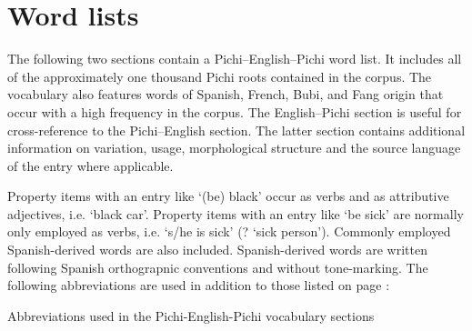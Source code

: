 \chapter{Word lists}
The following two sections contain a Pichi–English–Pichi word list. It includes all of the approximately one thousand Pichi roots contained in the corpus. The vocabulary also features words of Spanish, French, Bubi, and Fang origin that occur with a high frequency in the corpus. The English–Pichi section is useful for cross-reference to the Pichi–English section. The latter section contains additional information on variation, usage, morphological structure and the source language of the entry where applicable. 


Property items with an entry like  ‘(be) black’ occur as verbs and as attributive adjectives, i.e.  ‘black car’. Property items with an entry like  ‘be sick’ are normally only employed as verbs, i.e.  ‘s/he is sick’ (? ‘sick person’). Commonly employed Spanish-derived words are also included. Spanish-derived words are written following Spanish orthograpnic conventions and without tone-marking. The following abbreviations are used in addition to those listed on page \pageref{bkm:Ref240660292}:


\begin{styleTableEnglish}
Abbreviations used in the Pichi-English-Pichi vocabulary sections
\end{styleTableEnglish}

